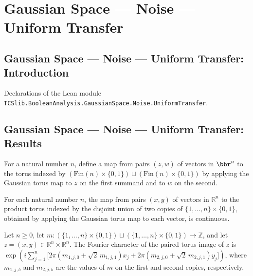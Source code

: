 \section{Gaussian Space --- Noise --- Uniform Transfer}
\subsection*{Gaussian Space --- Noise --- Uniform Transfer: Introduction}

Declarations of the Lean module \texttt{TCSlib.BooleanAnalysis.GaussianSpace.Noise.UniformTransfer}.

\subsection*{Gaussian Space --- Noise --- Uniform Transfer: Results}

\begin{definition}
\label{BooleanAnalysis.GaussianSpace.gaussianPairTorusMap}
\leanok
{}
For a natural number $n$, define a map from pairs $(z,w)$ of vectors in $\bbr^n$ to the
torus indexed by $(\mathrm{Fin}(n)\times\{0,1\})\sqcup(\mathrm{Fin}(n)\times\{0,1\})$ by
applying the Gaussian torus map to $z$ on the first summand and to $w$ on the second.
\end{definition}

\begin{lemma}
\label{BooleanAnalysis.GaussianSpace.continuous_gaussianPairTorusMap}
\leanok
{}
For each natural number $n$, the map from pairs $(x,y)$ of vectors in $\mathbb R^n$ to
the product torus indexed by the disjoint union of two copies of
$\{1,\ldots,n\}\times\{0,1\}$, obtained by applying the Gaussian torus map to each
vector, is continuous.
\end{lemma}

\begin{lemma}
\label{BooleanAnalysis.GaussianSpace.mFourier_gaussianPairTorusMap}
\leanok
{}
Let $n\ge 0$, let
$m:(\{1,\ldots,n\}\times\{0,1\})\sqcup(\{1,\ldots,n\}\times\{0,1\})\to\mathbb Z$, and
let $z=(x,y)\in\mathbb R^n\times\mathbb R^n$. The Fourier character of the paired torus
image of $z$ is
$\exp\!\left(i\sum_{j=1}^n\bigl[2\pi(m_{1,j,0}+\sqrt2\,m_{1,j,1})x_j+2\pi(m_{2,j,0}+\sqrt2\,m_{2,j,1})y_j\bigr]\right)$,
where $m_{1,j,b}$ and $m_{2,j,b}$ are the values of $m$ on the first and second copies,
respectively.
\end{lemma}

